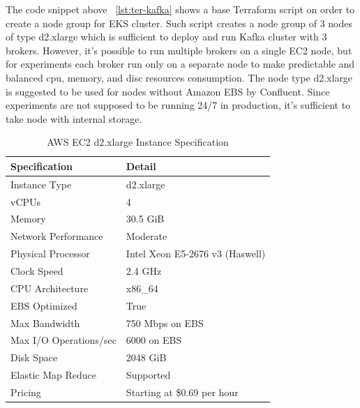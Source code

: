 The code snippet above ~\ref{lst:ter-kafka} shows a base Terraform script on order to create
a node group for EKS cluster.
Such script creates a node group of 3 nodes of type d2.xlarge which is sufficient to deploy and run
Kafka cluster with 3 brokers.
However, it's possible to run multiple brokers on a single EC2 node, but for experiments
each broker run only on a separate node to make predictable and balanced cpu, memory, and disc
resources consumption.
The node type d2.xlarge is suggested to be used for nodes without Amazon EBS by Confluent.
Since experiments are not supposed to be running 24/7 in production, it's sufficient to take node
with internal storage.


\begin{table}[h]
    \centering
    \begin{tabular}{@{}ll@{}}
        \toprule
        Specification          & Detail                       \\ \midrule
        Instance Type          & d2.xlarge                    \\
        vCPUs                  & 4                            \\
        Memory                 & 30.5 GiB                     \\
        Network Performance    & Moderate                     \\
        Physical Processor     & Intel Xeon E5-2676 v3 (Haswell) \\
        Clock Speed            & 2.4 GHz                      \\
        CPU Architecture       & x86\_64                      \\
        EBS Optimized          & True                         \\
        Max Bandwidth          & 750 Mbps on EBS              \\
        Max I/O Operations/sec & 6000 on EBS                  \\
        Disk Space             & 2048 GiB                     \\
        Elastic Map Reduce     & Supported                    \\
        Pricing                & Starting at \$0.69 per hour  \\ \bottomrule
    \end{tabular}
    \caption{AWS EC2 d2.xlarge Instance Specification}
    \label{tab:d2_xlarge_spec}
\end{table}


